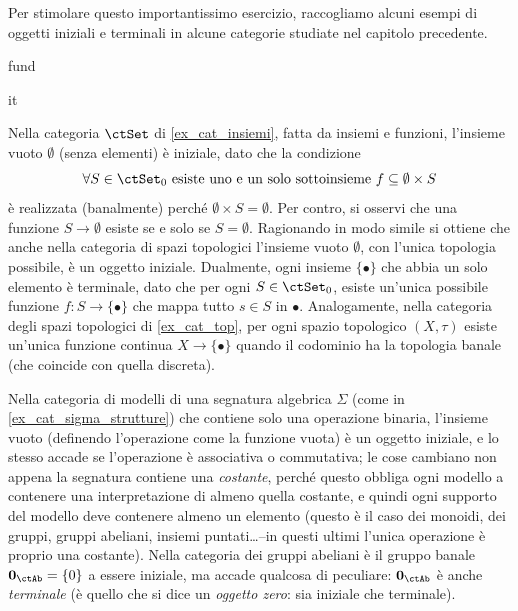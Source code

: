 Per stimolare questo importantissimo esercizio, raccogliamo alcuni esempi di oggetti iniziali e terminali in alcune categorie studiate nel capitolo precedente.
\begin{hExamples}{fund}\label{ex_ogg_init_term}
      \leavevmode
 \begin{enumtag}{it}
  \item\label{it_1} Nella categoria \(\ctSet\) di \ref{ex_cat_insiemi}, fatta da insiemi e funzioni, l'insieme vuoto \(\emptyset\) (senza elementi) è iniziale, dato che la condizione
  \[\forall S\in\ctSet_0 \text{ esiste uno e un solo sottoinsieme } f\subseteq \emptyset\times S \]
  è realizzata (banalmente) perché \(\emptyset\times S = \emptyset\). Per contro, si osservi che una funzione \(S \to \emptyset\) esiste se e solo se \(S=\emptyset\). Ragionando in modo simile si ottiene che anche nella categoria di spazi topologici l'insieme vuoto \(\emptyset\), con l'unica topologia possibile, è un oggetto iniziale. Dualmente, ogni insieme \(\{\bullet\}\) che abbia un solo elemento è terminale, dato che per ogni \(S\in\ctSet_0\), esiste un'unica possibile funzione \(f \colon S \to \{\bullet\}\) che mappa tutto \(s\in S\) in \(\bullet\). Analogamente, nella categoria degli spazi topologici di \ref{ex_cat_top}, per ogni spazio topologico \((X,\tau)\) esiste un'unica funzione continua \(X \to \{\bullet\}\) quando il codominio ha la topologia banale (che coincide con quella discreta).
  \item\label{it_2} Nella categoria di modelli di una segnatura algebrica \(\Sigma\) (come in \ref{ex_cat_sigma_strutture}) che contiene solo una operazione binaria, l'insieme vuoto (definendo l'operazione come la funzione vuota) è un oggetto iniziale, e lo stesso accade se l'operazione è associativa o commutativa; le cose cambiano non appena la segnatura contiene una \emph{costante}, perché questo obbliga ogni modello a contenere una interpretazione di almeno quella costante, e quindi ogni supporto del modello deve contenere almeno un elemento (questo è il caso dei monoidi, dei gruppi, gruppi abeliani, insiemi puntati\dots --in questi ultimi l'unica operazione è proprio una costante). Nella categoria dei gruppi abeliani è il gruppo banale \(\init_\ctAb=\{0\}\) a essere iniziale, ma accade qualcosa di peculiare: \(\init_\ctAb\) è anche \emph{terminale} (è quello che si dice un \emph{oggetto zero}: sia iniziale che terminale).

\end{enumtag}
\end{hExamples}
